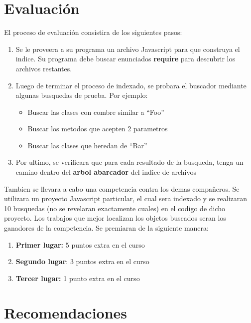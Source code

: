 \documentclass{article}
\begin{document}
\section{Evaluaci\'on}
El proceso de evaluaci\'on consistira de los siguientes pasos:
\begin{enumerate}
        \item{Se le proveera a su programa un archivo Javascript para que construya el indice.
        Su programa debe buscar enunciados {\bf require} para descubrir los archivos restantes.}
        \item{Luego de terminar el proceso de indexado, se probara el buscador mediante algunas
        busquedas de prueba. Por ejemplo:
        \begin{itemize}
                \item{Buscar las clases con combre similar a ``Foo''}
                \item{Buscar los metodos que acepten 2 parametros}
                \item{Buscar las clases que heredan de ``Bar''}
        \end{itemize}}
        \item{Por ultimo, se verificara que para cada resultado de la busqueda, tenga
        un camino dentro del {\bf arbol abarcador} del indice de archivos}
\end{enumerate}

Tambien se llevara a cabo una competencia contra los demas compa\~neros. Se utilizara un proyecto
Javascript particular, el cual sera indexado y se realizaran 10 busquedas (no se revelaran exactamente
cuales) en el codigo de dicho proyecto. Los trabajos que mejor localizan los objetos buscados seran
los ganadores de la competencia. Se premiaran de la siguiente manera:
\begin{enumerate}
        \item{{\bf Primer lugar:} 5 puntos extra en el curso}
        \item{{\bf Segundo lugar}: 3 puntos extra en el curso}
        \item{{\bf Tercer lugar:} 1 punto extra en el curso}
\end{enumerate}

\section{Recomendaciones}
\end{document}

